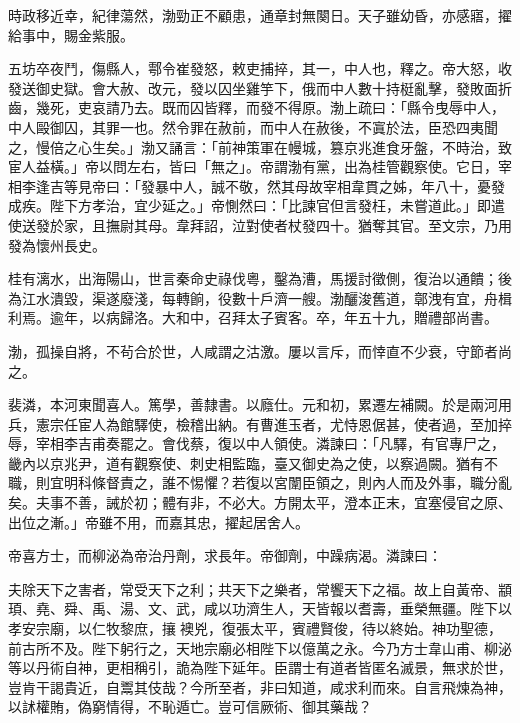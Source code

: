 \begin{pinyinscope}
 時政移近幸，紀律蕩然，渤勁正不顧患，通章封無闋日。天子雖幼昏，亦感寤，擢給事中，賜金紫服。



 五坊卒夜鬥，傷縣人，鄠令崔發怒，敕吏捕捽，其一，中人也，釋之。帝大怒，收發送御史獄。會大赦、改元，發以囚坐雞竽下，俄而中人數十持梃亂擊，發敗面折齒，幾死，吏哀請乃去。既而囚皆釋，而發不得原。渤上疏曰：「縣令曳辱中人，中人毆御囚，其罪一也。然令罪在赦前，而中人在赦後，不寘於法，臣恐四夷聞之，慢倍之心生矣。」渤又誦言：「前神策軍在幔城，篡京兆進食牙盤，不時治，致宦人益橫。」帝以問左右，皆曰「無之」。帝謂渤有黨，出為桂管觀察使。它日，宰相李逢吉等見帝曰：「發暴中人，誠不敬，然其母故宰相韋貫之姊，年八十，憂發成疾。陛下方孝治，宜少延之。」帝惻然曰：「比諫官但言發枉，未嘗道此。」即遣使送發於家，且撫尉其母。韋拜詔，泣對使者杖發四十。猶奪其官。至文宗，乃用發為懷州長史。



 桂有漓水，出海陽山，世言秦命史祿伐粵，鑿為漕，馬援討徵側，復治以通饋；後為江水潰毀，渠遂廢淺，每轉餉，役數十戶濟一艘。渤釃浚舊道，鄣洩有宜，舟楫利焉。逾年，以病歸洛。大和中，召拜太子賓客。卒，年五十九，贈禮部尚書。



 渤，孤操自將，不茍合於世，人咸謂之沽激。屢以言斥，而悻直不少衰，守節者尚之。



 裴潾，本河東聞喜人。篤學，善隸書。以廕仕。元和初，累遷左補闕。於是兩河用兵，憲宗任宦人為館驛使，檢稽出納。有曹進玉者，尤恃恩倨甚，使者過，至加捽辱，宰相李吉甫奏罷之。會伐蔡，復以中人領使。潾諫曰：「凡驛，有官專尸之，畿內以京兆尹，道有觀察使、刺史相監臨，臺又御史為之使，以察過闕。猶有不職，則宜明科條督責之，誰不惕懼？若復以宮闈臣領之，則內人而及外事，職分亂矣。夫事不善，誡於初；體有非，不必大。方開太平，澄本正末，宜塞侵官之原、出位之漸。」帝雖不用，而嘉其忠，擢起居舍人。



 帝喜方士，而柳泌為帝治丹劑，求長年。帝御劑，中躁病渴。潾諫曰：



 夫除天下之害者，常受天下之利；共天下之樂者，常饗天下之福。故上自黃帝、顓頊、堯、舜、禹、湯、文、武，咸以功濟生人，天皆報以耆壽，垂榮無疆。陛下以孝安宗廟，以仁牧黎庶，攘襖兇，復張太平，賓禮賢俊，待以終始。神功聖德，前古所不及。陛下躬行之，天地宗廟必相陛下以億萬之永。今乃方士韋山甫、柳泌等以丹術自神，更相稱引，詭為陛下延年。臣謂士有道者皆匿名滅景，無求於世，豈肯干謁貴近，自鬻其伎哉？今所至者，非曰知道，咸求利而來。自言飛煉為神，以訹權賄，偽窮情得，不恥遁亡。豈可信厥術、御其藥哉？




\end{pinyinscope}
